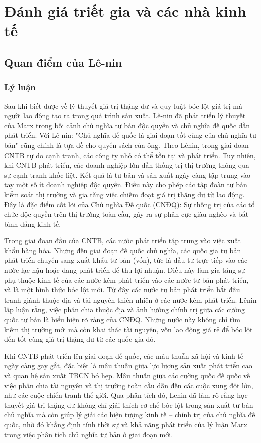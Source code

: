 \section{Đánh giá triết gia và các nhà kinh tế}

\subsection{Quan điểm của Lê-nin}
\subsubsection{Lý luận}
Sau khi biết được về lý thuyết giá trị thặng dư và quy luật bóc lột giá trị mà người lao động tạo ra trong quá trình sản xuất. Lê-nin đã phát triển lý thuyết của Marx trong bối cảnh chủ nghĩa tư bản độc quyền và chủ nghĩa đế quốc dần phát triển. Với Lê nin: "Chủ nghĩa đế quốc là giai đoạn tốt cùng của chủ nghĩa tư bản" \cite{LeninImperial} cũng chính là tựa đề cho quyển sách của ông. Theo Lênin, trong giai đoạn CNTB tự do cạnh tranh, các công ty nhỏ có thể tồn tại và phát triển. Tuy nhiên, khi CNTB phát triển, các doanh nghiệp lớn dần thống trị thị trường thông qua sự cạnh tranh khốc liệt. Kết quả là tư bản và sản xuất ngày càng tập trung vào tay một số ít doanh nghiệp độc quyền. Điều này cho phép các tập đoàn tư bản kiểm soát thị trường và gia tăng việc chiếm đoạt giá trị thặng dư từ lao động. Đây là đặc điểm cốt lõi của Chủ nghĩa Đế quốc (CNĐQ): Sự thống trị của các tổ chức độc quyền trên thị trường toàn cầu, gây ra sự phân cực giàu nghèo và bất bình đẳng kinh tế. \cite{ch1_Lenin_imper}

Trong giai đoạn đầu của CNTB, các nước phát triển tập trung vào việc xuất khẩu hàng hóa. Nhưng đến giai đoạn đế quốc chủ nghĩa, các quốc gia tư bản phát triển chuyển sang xuất khẩu tư bản (vốn), tức là đầu tư trực tiếp vào các nước lạc hậu hoặc đang phát triển để thu lợi nhuận. Điều này làm gia tăng sự phụ thuộc kinh tế của các nước kém phát triển vào các nước tư bản phát triển, và là một hình thức bóc lột mới. Từ đây các nước tư bản phát triển bắt đầu tranh giành thuộc địa và tài nguyên thiên nhiên ở các nước kém phát triển. Lênin lập luận rằng, việc phân chia thuộc địa và ảnh hưởng chính trị giữa các cường quốc tư bản là biểu hiện rõ ràng của CNĐQ. Những nước này không chỉ tìm kiếm thị trường mới mà còn khai thác tài nguyên, vốn lao động giá rẻ để bóc lột đến tốt cùng giá trị thặng dư từ các quốc gia đó. \cite{ch4_Lenin_imper}

Khi CNTB phát triển lên giai đoạn đế quốc, các mâu thuẫn xã hội và kinh tế ngày càng gay gắt, đặc biệt là mâu thuẫn giữa lực lượng sản xuất phát triển cao và quan hệ sản xuất TBCN bó hẹp. Mâu thuẫn giữa các cường quốc đế quốc về việc phân chia tài nguyên và thị trường toàn cầu dẫn đến các cuộc xung đột lớn, như các cuộc chiến tranh thế giới. Qua phân tích đó, Lenin đã làm rõ rằng học thuyết giá trị thặng dư không chỉ giải thích cơ chế bóc lột trong sản xuất tư bản chủ nghĩa mà còn giúp lý giải các hiện tượng kinh tế – chính trị của chủ nghĩa đế quốc, nhờ đó khẳng định tính thời sự và khả năng phát triển của lý luận Marx trong việc phân tích chủ nghĩa tư bản ở giai đoạn mới.

